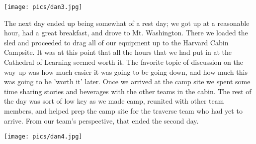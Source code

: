 \documentclass[10pt,a4paper]{article}
\newenvironment{Figure}
  {\par\medskip\noindent\minipage{\linewidth}}
  {\endminipage\par\medskip}
\begin{document}
\begin{multicols}{2}
\begin{Figure}
 \centering
 \texttt{[image: pics/dan3.jpg]}
\end{Figure}


The next day ended up being somewhat of a rest day; we got up at a reasonable hour, had a great breakfast, and drove to Mt. Washington.  There we loaded the sled and proceeded to drag all of our equipment up to the Harvard Cabin Campsite.  It was at this point that all the hours that we had put in at the Cathedral of Learning seemed worth it.  The favorite topic of discussion on the way up was how much easier it was going to be going down, and how much this was going to be 'worth it' later.  Once we arrived at the camp site we spent some time sharing stories and beverages with the other teams in the cabin.  The rest of the day was sort of low key as we made camp, reunited with other team members, and helped prep the camp site for the traverse team who had yet to arrive. From our team's perspective, that ended the second day.

\begin{Figure}
 \centering
 \texttt{[image: pics/dan4.jpg]}
\end{Figure}



\end{multicols}
\end{document}

